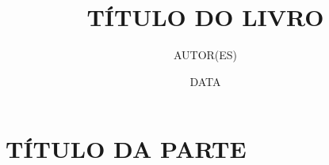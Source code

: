 \documentclass[12pt]{book}
\begin{document}
\frontmatter

\title{TÍTULO DO LIVRO}
\author{AUTOR(ES)}
\date{DATA}
\maketitle



\tableofcontents





\listoftables

\listoffigures


\mainmatter
\part{TÍTULO DA PARTE}



\appendix



\backmatter


\printindex


\end{document}

